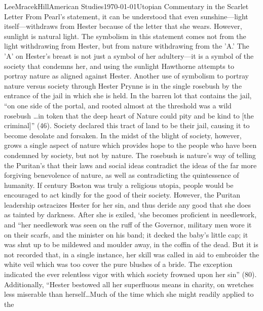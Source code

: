 \documentclass[12pt, letterpaper]{article}
\begin{document}
\begin{mla}{Lee}{Mracek}{Hill}{American Studies}{\today}{Utopian Commentary in the Scarlet Letter}
        From Pearl's statement, it can be understood that even sunshine---light itself---withdraws from Hester because of the letter that she wears. However, sunlight is natural light. The symbolism in this statement comes not from the light withdrawing from Hester, but from nature withdrawing from the 'A.' The 'A' on Hester's breast is not just a symbol of her adultery---it is a symbol of the society that condemns her, and using the sunlight Hawthorne attempts to portray nature as aligned against Hester. Another use of symbolism to portray nature versus society through Hester Prynne is in the single rosebush by the entrance of the jail in which she is held. In the barren lot that contains the jail, ``on one side of the portal, and rooted almost at the threshold was a wild rosebush \ldots in token that the deep heart of Nature could pity and be kind to [the criminal]'' (46). Society declared this tract of land to be their jail, causing it to become desolate and forsaken. In the midst of the blight of society, however, grows a single aspect of nature which provides hope to the people who have been condemned by society, but not by nature. The rosebush is nature's way of telling the Puritan's that their laws and social ideas contradict the ideas of the far more forgiving benevolence of nature, as well as contradicting the quintessence of humanity. If  century Boston was truly a religious utopia, people would be encouraged to act kindly for the good of their society. However, the Puritan leadership ostracizes Hester for her sin, and thus deride any good that she does as tainted by darkness. After she is exiled, `she becomes proficient in needlework, and ``her needlework was seen on the ruff of the Governor, military men wore it on their scarfs, and the minister on his band; it decked the baby's little cap; it was shut up to be mildewed and moulder away, in the coffin of the dead. But it is not recorded that, in a single instance, her skill was called in aid to embroider the white veil which was too cover the pure blushes of a bride. The exception indicated the ever relentless vigor with which society frowned upon her sin'' (80). Additionally, ``Hester bestowed all her superfluous means in charity, on wretches less miserable than herself\ldots Much of the time which she might readily applied to the 

\end{mla}
\end{document}
